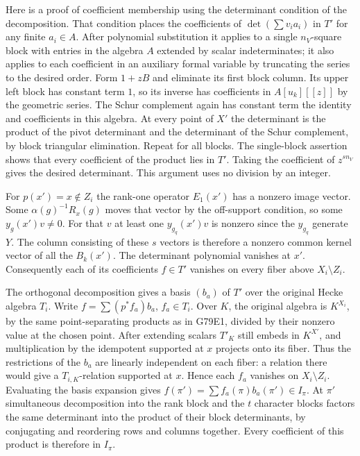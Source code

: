 Here is a proof of coefficient membership using the determinant
condition of the decomposition. That condition places the coefficients
of $\det(\sum v_i a_i)$ in $T'$ for any finite $a_i\in A$.
After polynomial substitution it applies to a single $n_V$-square block
with entries in the algebra $A$ extended by scalar indeterminates;
it also applies to each coefficient in an auxiliary formal variable
by truncating the series to the desired order. Form $1+zB$ and
eliminate its first block column. Its upper left block has constant
term $1$, so its inverse has coefficients in $A[u_k][[z]]$ by
the geometric series. The Schur complement again has constant term
the identity and coefficients in this algebra. At every point of
$X'$ the determinant is the product of the pivot determinant and
the determinant of the Schur complement, by block triangular
elimination. Repeat for all blocks. The single-block assertion shows
that every coefficient of the product lies in $T'$. Taking the
coefficient of $z^{s n_V}$ gives the desired determinant. This
argument uses no division by an integer.

For $p(x')=x\notin Z_i$ the rank-one operator $E_1(x')$ has a
nonzero image vector. Some $\alpha(g)^{-1}R_x(g)$ moves that
vector by the off-support condition, so some $y_g(x')v\ne0$.
For that $v$ at least one $y_{g_q}(x')v$ is nonzero since the
$y_{g_q}$ generate $Y$. The column consisting of these $s$ vectors
is therefore a nonzero common kernel vector of all the $B_k(x')$.
The determinant polynomial vanishes at $x'$. Consequently each of
its coefficients $f\in T'$ vanishes on every fiber above $X_i\setminus Z_i$.

The orthogonal decomposition gives a basis $(b_a)$ of $T'$ over
the original Hecke algebra $T_i$. Write $f=\sum (p^*f_a)b_a$,
$f_a\in T_i$. Over $K$, the original algebra is $K^{X_i}$,
by the same point-separating products as in G79E1, divided by
their nonzero value at the chosen point. After extending scalars
$T'_K$ still embeds in $K^{X'}$, and multiplication by the
idempotent supported at $x$ projects onto its fiber. Thus the
restrictions of the $b_a$ are linearly independent on each fiber:
a relation there would give a $T_{i,K}$-relation supported at $x$.
Hence each $f_a$ vanishes on $X_i\setminus Z_i$. Evaluating the
basis expansion gives $f(\pi')=\sum f_a(\pi)b_a(\pi')\in I_\pi$.
At $\pi'$ simultaneous decomposition into the rank block and the
$t$ character blocks factors the same determinant into the product
of their block determinants, by conjugating and reordering rows
and columns together. Every coefficient of this product is therefore
in $I_\pi$.


